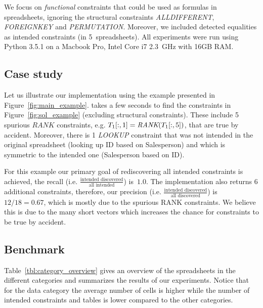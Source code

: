 We focus on \textit{functional} constraints that could be used as formulas in spreadsheets, ignoring the structural constraints \textit{ALLDIFFERENT}, \textit{FOREIGNKEY} and \textit{PERMUTATION}.
Moreover, we included detected equalities as intended constraints (in 5~spreadsheets).
All experiments were run using Python 3.5.1 on a Macbook Pro, Intel Core i7 2.3~GHz with 16GB RAM.







\subsection{Case study}
Let us illustrate our implementation using the example presented in Figure~\ref{fig:main_example}.
\sname takes a few seconds to find the constraints in Figure~\ref{fig:sol_example} (excluding structural constraints).
These include 5 spurious $\textit{RANK}$ constraints, e.g. $T_1[:,1] = \textit{RANK}(T_1[:,5])$, that are true by accident.
Moreover, there is 1 \textit{LOOKUP} constraint that was not intended in the original spreadsheet (looking up ID based on Salesperson) and which is symmetric to the intended one (Salesperson based on ID).

For this example our primary goal of rediscovering all intended constraints is achieved, the recall (i.e. $\frac{\text{intended discovered}}{\text{all intended}}$) is~$1.0$.
The implementation also returns 6 additional constraints, therefore, our precision (i.e. $\frac{\text{intended discovered}}{\text{all discovered}}$) is $12/18 = 0.67$, which is mostly due to the spurious RANK constraints. We believe this is due to the many short vectors which increases the chance for constraints to be true by accident.





\subsection{Benchmark}
Table~\ref{tbl:category_overview} gives an overview of the spreadsheets in the different categories and summarizes the results of our experiments.
Notice that for the data category the average number of cells is higher while the number of intended constraints and tables is lower compared to the other categories.

